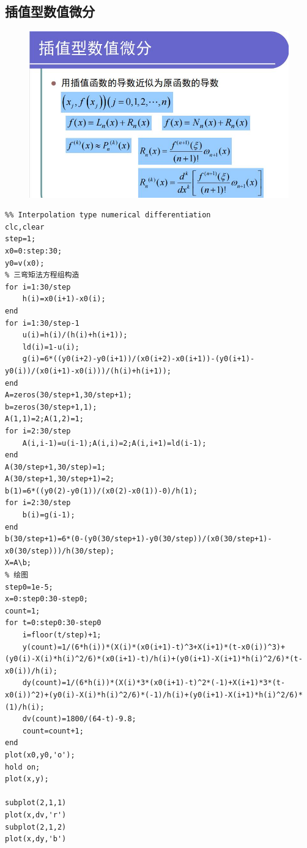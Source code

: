 \documentclass[a4paper,12pt]{ctexart}
\begin{document}
\subsection{插值型数值微分}
\begin{figure}[H]
    \centering
    \includegraphics[width=14cm]{第五章作业/czwf.jpg}
\end{figure}
\begin{lstlisting}
%% Interpolation type numerical differentiation
clc,clear
step=1;
x0=0:step:30;
y0=v(x0);
% 三弯矩法方程组构造
for i=1:30/step
    h(i)=x0(i+1)-x0(i);
end
for i=1:30/step-1
    u(i)=h(i)/(h(i)+h(i+1));
    ld(i)=1-u(i);
    g(i)=6*((y0(i+2)-y0(i+1))/(x0(i+2)-x0(i+1))-(y0(i+1)-y0(i))/(x0(i+1)-x0(i)))/(h(i)+h(i+1));
end
A=zeros(30/step+1,30/step+1);
b=zeros(30/step+1,1);
A(1,1)=2;A(1,2)=1;
for i=2:30/step
    A(i,i-1)=u(i-1);A(i,i)=2;A(i,i+1)=ld(i-1);
end
A(30/step+1,30/step)=1;
A(30/step+1,30/step+1)=2;
b(1)=6*((y0(2)-y0(1))/(x0(2)-x0(1))-0)/h(1);
for i=2:30/step
    b(i)=g(i-1);
end
b(30/step+1)=6*(0-(y0(30/step+1)-y0(30/step))/(x0(30/step+1)-x0(30/step)))/h(30/step);
X=A\b;
% 绘图
step0=1e-5;
x=0:step0:30-step0;
count=1;
for t=0:step0:30-step0
    i=floor(t/step)+1;
    y(count)=1/(6*h(i))*(X(i)*(x0(i+1)-t)^3+X(i+1)*(t-x0(i))^3)+(y0(i)-X(i)*h(i)^2/6)*(x0(i+1)-t)/h(i)+(y0(i+1)-X(i+1)*h(i)^2/6)*(t-x0(i))/h(i);
    dy(count)=1/(6*h(i))*(X(i)*3*(x0(i+1)-t)^2*(-1)+X(i+1)*3*(t-x0(i))^2)+(y0(i)-X(i)*h(i)^2/6)*(-1)/h(i)+(y0(i+1)-X(i+1)*h(i)^2/6)*(1)/h(i);
    dv(count)=1800/(64-t)-9.8;
    count=count+1;
end
plot(x0,y0,'o');
hold on;
plot(x,y);

subplot(2,1,1)
plot(x,dv,'r')
subplot(2,1,2)
plot(x,dy,'b')
\end{lstlisting}
\end{document}
